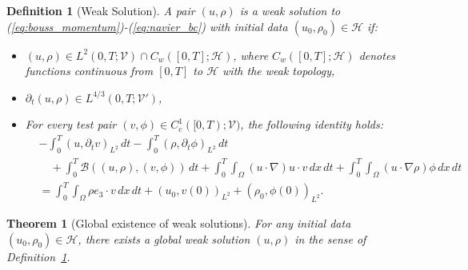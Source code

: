 \documentclass[11pt,reqno]{amsart}
\theoremstyle{plain}
\newtheorem{defn}[thm]{Definition}
\newtheorem{theorem}[thm]{Theorem}
\numberwithin{equation}{section}
\begin{document}
\begin{defn}[Weak Solution]\label{def:weak_sol}
A pair $(u,\rho)$ is a weak solution to (\ref{eq:bouss_momentum})-(\ref{eq:navier_bc}) with initial data $(u_0,\rho_0)\in\mathcal{H}$ if:
\begin{itemize}
    \item $(u, \rho) \in L^2(0,T; \mathcal{V}) \cap C_w([0,T];\mathcal{H})$, where $C_w([0,T];\mathcal{H})$ denotes functions continuous from $[0,T]$ to $\mathcal{H}$ with the weak topology,
    \item $\partial_t (u,\rho) \in L^{4/3}(0,T; \mathcal{V}')$,
    \item For every test pair $(v,\phi)\in C_c^1([0,T);\mathcal V)$, the following identity holds:    \begin{equation}\label{weaksolution1}
    \begin{aligned}
    &-\int_0^T (u,\partial_t v)_{L^2}\,dt
    -\int_0^T (\rho,\partial_t\phi)_{L^2}\,dt \\
    &\quad+\int_0^T \mathscr{B}((u,\rho),(v,\phi))\,dt+\int_0^T\int_\Omega(u\cdot\nabla)u\cdot v\,dx\,dt+\int_0^T\int_\Omega (u\cdot\nabla\rho)\phi\,dx\,dt \\
    &=\int_0^T\int_\Omega \rho e_3\cdot v\,dx\,dt
    +(u_0,v(0))_{L^2}+(\rho_0,\phi(0))_{L^2}.
    \end{aligned}
    \end{equation}
\end{itemize}
\end{defn}

\begin{theorem}[Global existence of weak solutions] \label{thm:global_existence}
For any initial data $(u_0,\rho_0)\in\mathcal{H}$, there exists a global weak solution $(u,\rho)$ in the sense of Definition~\ref{def:weak_sol}.
\end{theorem}
\end{document}
